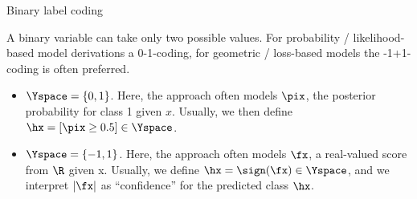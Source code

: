 \begin{vbframe}{Binary label coding}


\lz

A binary variable can take only two possible values.
For probability / likelihood-based model derivations a 0-1-coding, for geometric / loss-based models
the -1+1-coding is often preferred.

\begin{itemize}
\item $\Yspace = \{0, 1\}$. Here, the approach often models $\pix$, the posterior probability for class 1 given $x$.
  Usually, we then define $\hx = [\pix \geq 0.5] \in \Yspace$.
\item $\Yspace = \{-1, 1\}$. Here, the approach often models $\fx$, a real-valued score from $\R$ given x.
  Usually, we define $\hx = \sign(\fx) \in \Yspace$, and we interpret
  $|\fx|$ as \enquote{confidence} for the predicted class $\hx$.
\end{itemize}

\lz


\end{vbframe}


